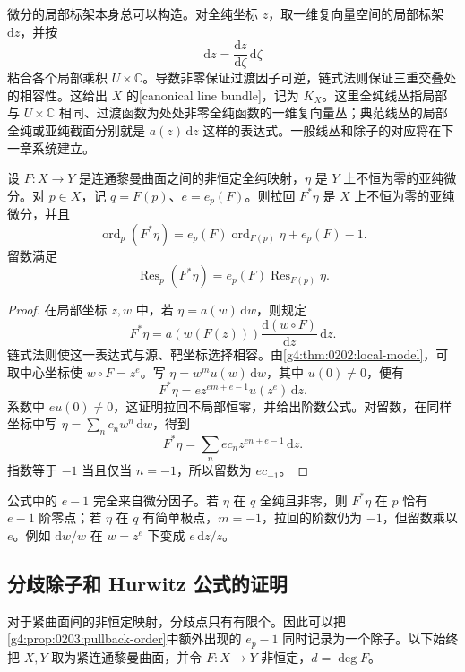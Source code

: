 \ProseParagraphBreak

微分的局部标架本身总可以构造。对全纯坐标 \(z\)，取一维复向量空间的局部标架 \(\mathrm{d}z\)，并按
\[
	\mathrm{d}z=\frac{\mathrm{d}z}{\mathrm{d}\zeta}\,\mathrm{d}\zeta
\]
粘合各个局部乘积 \(U\times\mathbb C\)。导数非零保证过渡因子可逆，链式法则保证三重交叠处的相容性。这给出 \(X\) 的[canonical line bundle]，记为 \(K_X\)。这里全纯线丛指局部与 \(U\times\mathbb C\) 相同、过渡函数为处处非零全纯函数的一维复向量丛；典范线丛的局部全纯或亚纯截面分别就是 \(a(z)\,\mathrm{d}z\) 这样的表达式。一般线丛和除子的对应将在下一章系统建立。

\begin{proposition}
	\label{g4:prop:0203:pullback-order}
	设 \(F:X\rightarrow Y\) 是连通黎曼曲面之间的非恒定全纯映射，\(\eta\) 是 \(Y\) 上不恒为零的亚纯微分。对 \(p\in X\)，记 \(q=F(p)\)、\(e=e_p(F)\)。则拉回 \(F^*\eta\) 是 \(X\) 上不恒为零的亚纯微分，并且
	\begin{equation}
		\label{g4:eq:0203:pullback-order}
		\operatorname{ord}_p(F^*\eta)
		=e_p(F)\operatorname{ord}_{F(p)}\eta+e_p(F)-1.
	\end{equation}
	留数满足
	\[
		\operatorname{Res}_p(F^*\eta)
		=e_p(F)\operatorname{Res}_{F(p)}\eta.
	\]
\end{proposition}

\begin{proof}
	在局部坐标 \(z,w\) 中，若 \(\eta=a(w)\,\mathrm{d}w\)，则规定
	\[
		F^*\eta=a(w(F(z)))\frac{\mathrm{d}(w\circ F)}{\mathrm{d}z}\,\mathrm{d}z.
	\]
	链式法则使这一表达式与源、靶坐标选择相容。由\cref{g4:thm:0202:local-model}，可取中心坐标使 \(w\circ F=z^e\)。写 \(\eta=w^m u(w)\,\mathrm{d}w\)，其中 \(u(0)\ne0\)，便有
	\[
		F^*\eta=e z^{em+e-1}u(z^e)\,\mathrm{d}z.
	\]
	系数中 \(e u(0)\ne0\)，这证明拉回不局部恒零，并给出阶数公式。对留数，在同样坐标中写 \(\eta=\sum_n c_nw^n\,\mathrm{d}w\)，得到
	\[
		F^*\eta=\sum_n e c_n z^{en+e-1}\,\mathrm{d}z.
	\]
	指数等于 \(-1\) 当且仅当 \(n=-1\)，所以留数为 \(e c_{-1}\)。
\end{proof}

公式中的 \(e-1\) 完全来自微分因子。若 \(\eta\) 在 \(q\) 全纯且非零，则 \(F^*\eta\) 在 \(p\) 恰有 \(e-1\) 阶零点；若 \(\eta\) 在 \(q\) 有简单极点，\(m=-1\)，拉回的阶数仍为 \(-1\)，但留数乘以 \(e\)。例如 \(\mathrm{d}w/w\) 在 \(w=z^e\) 下变成 \(e\,\mathrm{d}z/z\)。

\subsection{分歧除子和 Hurwitz 公式的证明}
\label{g4:subsec:0203:04}
对于紧曲面间的非恒定映射，分歧点只有有限个。因此可以把\cref{g4:prop:0203:pullback-order}中额外出现的 \(e_p-1\) 同时记录为一个除子。以下始终把 \(X,Y\) 取为紧连通黎曼曲面，并令 \(F:X\rightarrow Y\) 非恒定，\(d=\deg F\)。

